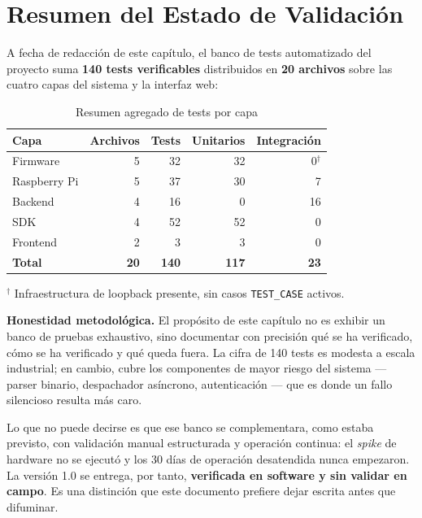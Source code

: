\section{Resumen del Estado de Validación}

A fecha de redacción de este capítulo, el banco de tests automatizado del proyecto
suma \textbf{140 tests verificables} distribuidos en \textbf{20 archivos} sobre las
cuatro capas del sistema y la interfaz web:

\begin{table}[H]
    \centering
    \caption{Resumen agregado de tests por capa}
    \begin{tabular}{lrrrr}
        \toprule
        \textbf{Capa}      & \textbf{Archivos} & \textbf{Tests} & \textbf{Unitarios} & \textbf{Integración} \\
        \midrule
        Firmware           & 5                 & 32             & 32                 & 0$^{\dagger}$ \\
        Raspberry Pi       & 5                 & 37             & 30                 & 7 \\
        Backend            & 4                 & 16             & 0                  & 16 \\
        SDK                & 4                 & 52             & 52                 & 0 \\
        Frontend           & 2                 & 3              & 3                  & 0 \\
        \midrule
        \textbf{Total}     & \textbf{20}       & \textbf{140}   & \textbf{117}       & \textbf{23} \\
        \bottomrule
    \end{tabular}
    \label{tab:tests_summary}
\end{table}

\noindent$^{\dagger}$ Infraestructura de loopback presente, sin casos
\texttt{TEST\_CASE} activos.

\begin{designnote}
\textbf{Honestidad metodológica.} El propósito de este capítulo no es exhibir un
banco de pruebas exhaustivo, sino documentar con precisión qué se ha verificado,
cómo se ha verificado y qué queda fuera. La cifra de 140 tests es modesta a escala
industrial; en cambio, cubre los componentes de mayor riesgo del sistema --- parser
binario, despachador asíncrono, autenticación --- que es donde un fallo silencioso
resulta más caro.

Lo que no puede decirse es que ese banco se complementara, como estaba previsto, con
validación manual estructurada y operación continua: el \textit{spike} de hardware no
se ejecutó y los 30 días de operación desatendida nunca empezaron. La versión 1.0
se entrega, por tanto, \textbf{verificada en software y sin validar en campo}. Es una
distinción que este documento prefiere dejar escrita antes que difuminar.
\end{designnote}
